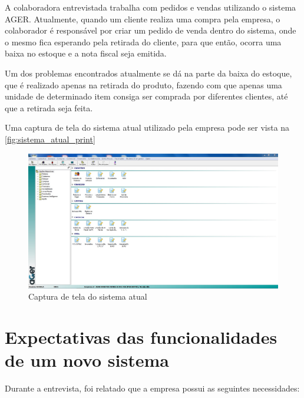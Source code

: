 \documentclass[serif, english, brazilian, oneside]{uffstex}
\begin{document}
A colaboradora entrevistada trabalha com pedidos e vendas utilizando o sistema AGER. Atualmente, quando um cliente realiza uma compra pela empresa, o colaborador é responsável por criar um pedido de venda dentro do sistema, onde o mesmo fica esperando pela retirada do cliente, para que então, ocorra uma baixa no estoque e a nota fiscal seja emitida.

Um dos problemas encontrados atualmente se dá na parte da baixa do estoque, que é realizado apenas na retirada do produto, fazendo com que apenas uma unidade de determinado item consiga ser comprada por diferentes clientes, até que a retirada seja feita.

Uma captura de tela do sistema atual utilizado pela empresa pode ser vista na \autoref{fig:sistema_atual_print}

\newpage

\begin{figure}[!htpb]
    \centering
    \caption{Captura de tela do sistema atual}
    \label{fig:sistema_atual_print}
    \includegraphics[width=\linewidth]{imagens/sistema_atual.jpeg}
\end{figure}

\section{Expectativas das funcionalidades de um novo sistema}

Durante a entrevista, foi relatado que a empresa possui as seguintes necessidades:
\end{document}
